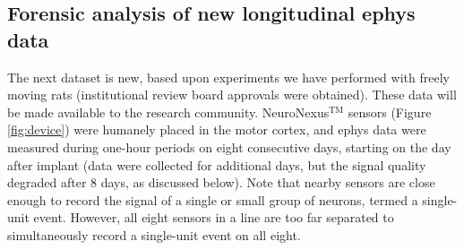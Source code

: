\documentclass[journal]{IEEEtran}
\begin{document}
%
%


\subsection{Forensic analysis of new longitudinal ephys data\label{sec:forensics}}

The next dataset is new, based upon experiments we have performed with freely moving rats (institutional review board approvals were obtained). These data will be made available to the research community. NeuroNexus$^{\mbox{TM}}$ sensors (Figure \ref{fig:device}) were humanely placed in the motor cortex, and ephys data were measured during one-hour periods on eight consecutive days, starting on the day after implant (data were collected for additional days, but the signal quality degraded after 8 days, as discussed below). Note that nearby sensors are close enough to record the signal of a single or small group of neurons, termed a single-unit event. However, all eight sensors in a line are too far separated to simultaneously record a single-unit event on all eight.
\end{document}
